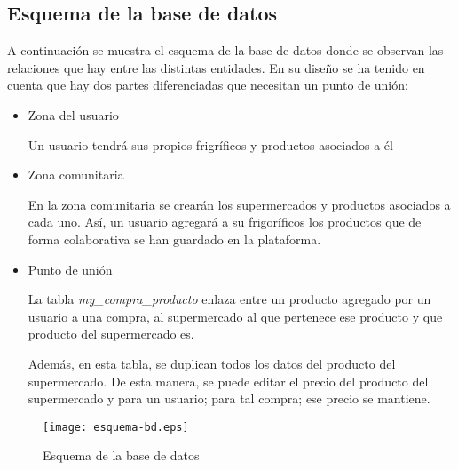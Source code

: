 \subsection{Esquema de la base de datos}

    A continuación se muestra el esquema de la base de datos donde se observan las relaciones que hay entre las distintas entidades. En su diseño se ha tenido en cuenta que hay dos partes diferenciadas que necesitan un punto de unión:

    \begin{itemize}
        \item Zona del usuario

            Un usuario tendrá sus propios frigríficos y productos asociados a él

        \item Zona comunitaria

            En la zona comunitaria se crearán los supermercados y productos asociados a cada uno. Así, un usuario agregará a su frigoríficos los productos que de forma colaborativa se han guardado en la plataforma.

        \item Punto de unión

            La tabla \emph{my\_compra\_producto} enlaza entre un producto agregado por un usuario a una compra, al supermercado al que pertenece ese producto y que producto del supermercado es.

            Además, en esta tabla, se duplican todos los datos del producto del supermercado. De esta manera, se puede editar el precio del producto del supermercado y para un usuario; para tal compra; ese precio se mantiene.
    \end{itemize}

\begin{figure}[H]
    \centering
    \texttt{[image: esquema-bd.eps]}
    \caption{Esquema de la base de datos}\label{fig:esquema-bd}
\end{figure}
